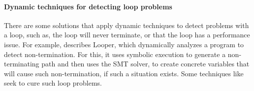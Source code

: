 \paragraph{Dynamic techniques for detecting loop problems}
There are some solutions that apply dynamic techniques to detect problems with a loop, such as, the loop will never terminate, or that the loop has a performance issue. For example, \cite{looper_burnim_ase09} describes {\sc Looper}, which dynamically analyzes a program to detect non-termination. For this, it uses symbolic execution to generate a non-terminating path and then uses the SMT solver, to create concrete variables that will cause such non-termination, if such a situation exists. Some techniques like \cite{kling2012bolt} seek to cure such loop problems. 
